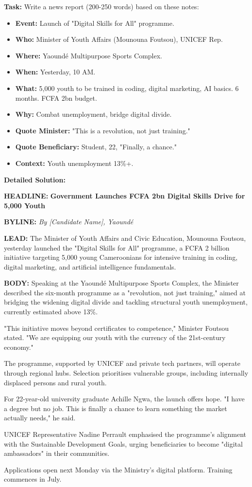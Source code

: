 \documentclass[11pt]{article}
\begin{document}
\begin{exoresolu}
\textbf{Task:} Write a news report (200-250 words) based on these notes:
\begin{itemize}
    \item \textbf{Event:} Launch of "Digital Skills for All" programme.
    \item \textbf{Who:} Minister of Youth Affairs (Mounouna Foutsou), UNICEF Rep.
    \item \textbf{Where:} Yaoundé Multipurpose Sports Complex.
    \item \textbf{When:} Yesterday, 10 AM.
    \item \textbf{What:} 5,000 youth to be trained in coding, digital marketing, AI basics. 6 months. FCFA 2bn budget.
    \item \textbf{Why:} Combat unemployment, bridge digital divide.
    \item \textbf{Quote Minister:} "This is a revolution, not just training."
    \item \textbf{Quote Beneficiary:} Student, 22, "Finally, a chance."
    \item \textbf{Context:} Youth unemployment 13\%+.
\end{itemize}

\tcblower
\textbf{Detailed Solution:}

\textbf{HEADLINE:} \textbf{Government Launches FCFA 2bn Digital Skills Drive for 5,000 Youth}

\textbf{BYLINE:} \textit{By [Candidate Name], Yaoundé}

\textbf{LEAD:} The Minister of Youth Affairs and Civic Education, Mounouna Foutsou, yesterday launched the "Digital Skills for All" programme, a FCFA 2 billion initiative targeting 5,000 young Cameroonians for intensive training in coding, digital marketing, and artificial intelligence fundamentals.

\textbf{BODY:} Speaking at the Yaoundé Multipurpose Sports Complex, the Minister described the six-month programme as a "revolution, not just training," aimed at bridging the widening digital divide and tackling structural youth unemployment, currently estimated above 13\%.

"This initiative moves beyond certificates to competence," Minister Foutsou stated. "We are equipping our youth with the currency of the 21st-century economy."

The programme, supported by UNICEF and private tech partners, will operate through regional hubs. Selection prioritises vulnerable groups, including internally displaced persons and rural youth.

For 22-year-old university graduate Achille Ngwa, the launch offers hope. "I have a degree but no job. This is finally a chance to learn something the market actually needs," he said.

UNICEF Representative Nadine Perrault emphasised the programme's alignment with the Sustainable Development Goals, urging beneficiaries to become "digital ambassadors" in their communities.

Applications open next Monday via the Ministry's digital platform. Training commences in July.
\end{exoresolu}
\end{document}
